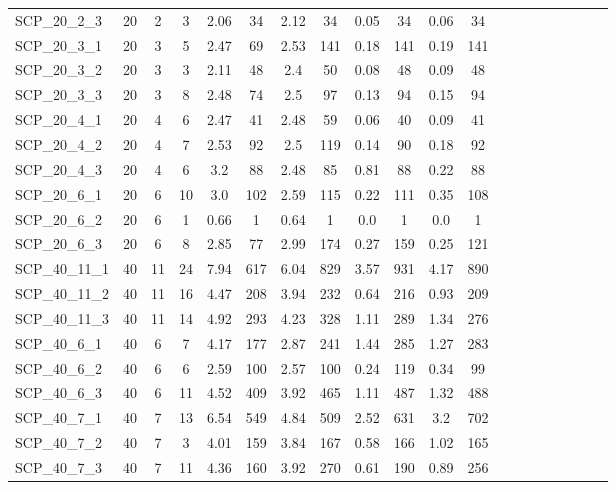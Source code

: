 \begin{sidewaystable}[!ht]
{\begin{tabular}{lccccccccccccccccccc}
SCP\_20\_2\_3 & 20 & 2 & 3 & 2.06 & 34 & 2.12 & 34 &  \textcolor{blue2}{0.05} & 34 & 0.06 & 34 \\
SCP\_20\_3\_1 & 20 & 3 & 5 & 2.47 & 69 & 2.53 & 141 &  \textcolor{blue2}{0.18} & 141 & 0.19 & 141 \\
SCP\_20\_3\_2 & 20 & 3 & 3 & 2.11 & 48 & 2.4 & 50 &  \textcolor{blue2}{0.08} & 48 & 0.09 & 48 \\
SCP\_20\_3\_3 & 20 & 3 & 8 & 2.48 & 74 & 2.5 & 97 &  \textcolor{blue2}{0.13} & 94 & 0.15 & 94 \\
SCP\_20\_4\_1 & 20 & 4 & 6 & 2.47 & 41 & 2.48 & 59 &  \textcolor{blue2}{0.06} & 40 & 0.09 & 41 \\
SCP\_20\_4\_2 & 20 & 4 & 7 & 2.53 & 92 & 2.5 & 119 &  \textcolor{blue2}{0.14} & 90 & 0.18 & 92 \\
SCP\_20\_4\_3 & 20 & 4 & 6 & 3.2 & 88 & 2.48 & 85 & 0.81 & 88 & 0.22 & 88 \\
SCP\_20\_6\_1 & 20 & 6 & 10 & 3.0 & 102 & 2.59 & 115 &  \textcolor{blue2}{0.22} & 111 & 0.35 & 108 \\
SCP\_20\_6\_2 & 20 & 6 & 1 & 0.66 & 1 & 0.64 & 1 &  \textcolor{blue2}{0.0} & 1 &  \textcolor{blue2}{0.0} & 1 \\
SCP\_20\_6\_3 & 20 & 6 & 8 & 2.85 & 77 & 2.99 & 174 & 0.27 & 159 &  \textcolor{blue2}{0.25} & 121 \\
SCP\_40\_11\_1 & 40 & 11 & 24 & 7.94 & 617 & 6.04 & 829 &  \textcolor{blue2}{3.57} & 931 & 4.17 & 890 \\
SCP\_40\_11\_2 & 40 & 11 & 16 & 4.47 & 208 & 3.94 & 232 &  \textcolor{blue2}{0.64} & 216 & 0.93 & 209 \\
SCP\_40\_11\_3 & 40 & 11 & 14 & 4.92 & 293 & 4.23 & 328 &  \textcolor{blue2}{1.11} & 289 & 1.34 & 276 \\
SCP\_40\_6\_1 & 40 & 6 & 7 & 4.17 & 177 & 2.87 & 241 & 1.44 & 285 & 1.27 & 283 \\
SCP\_40\_6\_2 & 40 & 6 & 6 & 2.59 & 100 & 2.57 & 100 &  \textcolor{blue2}{0.24} & 119 & 0.34 & 99 \\
SCP\_40\_6\_3 & 40 & 6 & 11 & 4.52 & 409 & 3.92 & 465 &  \textcolor{blue2}{1.11} & 487 & 1.32 & 488 \\
SCP\_40\_7\_1 & 40 & 7 & 13 & 6.54 & 549 & 4.84 & 509 &  \textcolor{blue2}{2.52} & 631 & 3.2 & 702 \\
SCP\_40\_7\_2 & 40 & 7 & 3 & 4.01 & 159 & 3.84 & 167 &  \textcolor{blue2}{0.58} & 166 & 1.02 & 165 \\
SCP\_40\_7\_3 & 40 & 7 & 11 & 4.36 & 160 & 3.92 & 270 &  \textcolor{blue2}{0.61} & 190 & 0.89 & 256 \\

\end{tabular}}
\end{sidewaystable}
